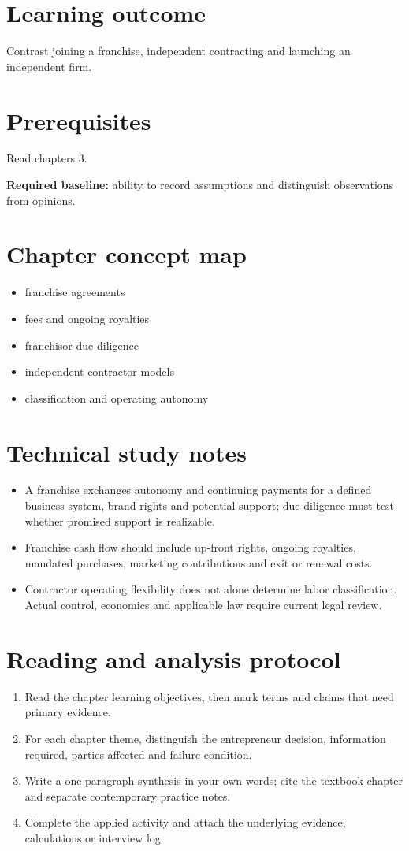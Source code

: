 \documentclass[11pt,letterpaper]{article}
\begin{document}
\SuiteOpen
\section{Learning outcome}
Contrast joining a franchise, independent contracting and launching an independent firm.
\section{Prerequisites}
Read chapters 3.\par\textbf{Required baseline:} ability to record assumptions and distinguish observations from opinions.
\section{Chapter concept map}
\begin{itemize}[leftmargin=*,itemsep=3pt]
\item franchise agreements
\item fees and ongoing royalties
\item franchisor due diligence
\item independent contractor models
\item classification and operating autonomy
\end{itemize}

\section{Technical study notes}
\begin{itemize}[leftmargin=*,itemsep=3pt]
\item A franchise exchanges autonomy and continuing payments for a defined business system, brand rights and potential support; due diligence must test whether promised support is realizable.
\item Franchise cash flow should include up-front rights, ongoing royalties, mandated purchases, marketing contributions and exit or renewal costs.
\item Contractor operating flexibility does not alone determine labor classification. Actual control, economics and applicable law require current legal review.
\end{itemize}

\section{Reading and analysis protocol}
\begin{enumerate}[leftmargin=*,itemsep=5pt]
\item Read the chapter learning objectives, then mark terms and claims that need primary evidence.
\item For each chapter theme, distinguish the entrepreneur decision, information required, parties affected and failure condition.
\item Write a one-paragraph synthesis in your own words; cite the textbook chapter and separate contemporary practice notes.
\item Complete the applied activity and attach the underlying evidence, calculations or interview log.
\end{enumerate}
\end{document}
